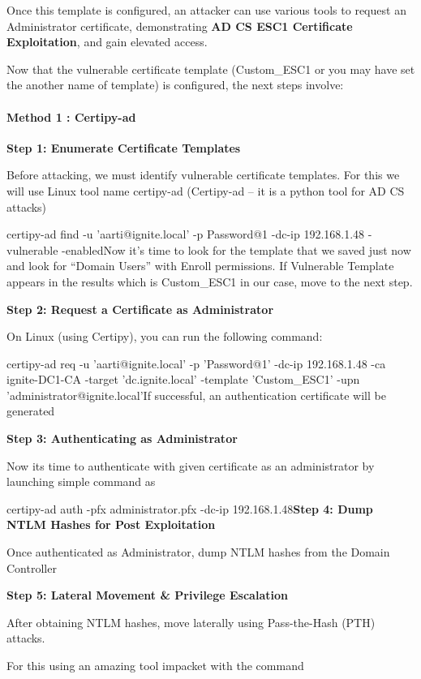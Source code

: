 Once this template is configured, an attacker can use various tools to request an Administrator certificate, demonstrating \textbf{AD CS ESC1 Certificate Exploitation}, and gain elevated access.

Now that the vulnerable certificate template (Custom\_ESC1 or you may have set the another name of template) is configured, the next steps involve:

\paragraph{\textbf{Method 1 : Certipy-ad}}

\textbf{Step 1: Enumerate Certificate Templates}

Before attacking, we must identify vulnerable certificate templates. For this we will use Linux tool name certipy-ad (Certipy-ad – it is a python tool for AD CS attacks)

certipy-ad find -u 'aarti@ignite.local' -p Password@1 -dc-ip 192.168.1.48 -vulnerable -enabledNow it’s time to look for the template that we saved just now and look for “Domain Users” with Enroll permissions. If Vulnerable Template appears in the results which is Custom\_ESC1 in our case, move to the next step.

\textbf{Step 2: Request a Certificate as Administrator}

On Linux (using Certipy), you can run the following command:

certipy-ad req -u 'aarti@ignite.local' -p 'Password@1' -dc-ip 192.168.1.48 -ca ignite-DC1-CA -target 'dc.ignite.local' -template 'Custom\_ESC1' -upn 'administrator@ignite.local'If successful, an authentication certificate will be generated

\textbf{Step 3: Authenticating as Administrator}

Now its time to authenticate with given certificate as an administrator by launching simple command as

certipy-ad auth -pfx administrator.pfx -dc-ip 192.168.1.48\textbf{Step 4: Dump NTLM Hashes for Post Exploitation}

Once authenticated as Administrator, dump NTLM hashes from the Domain Controller

\textbf{Step 5: Lateral Movement \& Privilege Escalation}

After obtaining NTLM hashes, move laterally using Pass-the-Hash (PTH) attacks.

For this using an amazing tool impacket with the command

